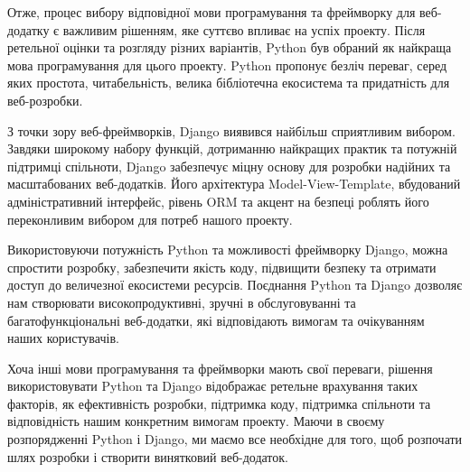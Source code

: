 
Отже, процес вибору відповідної мови програмування та фреймворку для веб-додатку є важливим рішенням, яке суттєво впливає на успіх проекту. Після ретельної оцінки та розгляду різних варіантів, Python був обраний як найкраща мова програмування для цього проекту. Python пропонує безліч переваг, серед яких простота, читабельність, велика бібліотечна екосистема та придатність для веб-розробки.

З точки зору веб-фреймворків, Django виявився найбільш сприятливим вибором. Завдяки широкому набору функцій, дотриманню найкращих практик та потужній підтримці спільноти, Django забезпечує міцну основу для розробки надійних та масштабованих веб-додатків. Його архітектура Model-View-Template, вбудований адміністративний інтерфейс, рівень ORM та акцент на безпеці роблять його переконливим вибором для потреб нашого проекту.

Використовуючи потужність Python та можливості фреймворку Django, можна спростити розробку, забезпечити якість коду, підвищити безпеку та отримати доступ до величезної екосистеми ресурсів. Поєднання Python та Django дозволяє нам створювати високопродуктивні, зручні в обслуговуванні та багатофункціональні веб-додатки, які відповідають вимогам та очікуванням наших користувачів.

Хоча інші мови програмування та фреймворки мають свої переваги, рішення використовувати Python та Django відображає ретельне врахування таких факторів, як ефективність розробки, підтримка коду, підтримка спільноти та відповідність нашим конкретним вимогам проекту. Маючи в своєму розпорядженні Python і Django, ми маємо все необхідне для того, щоб розпочати шлях розробки і створити винятковий веб-додаток.